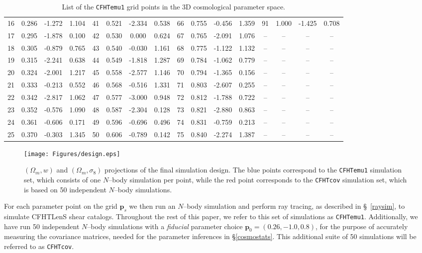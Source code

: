 \documentclass[reprint,aps,prd,superscriptaddress,showkeys,showpacs]{revtex4-1}
\begin{document}
\begin{table*}
\begin{tabular}{c|ccc||c|ccc||c|ccc||c|ccc}
16 & 0.286 & -1.272 & 1.104 & 41 & 0.521 & -2.334 & 0.538 & 66 & 0.755 & -0.456 & 1.359 & 91 & 1.000 & -1.425 & 0.708 \\
17 & 0.295 & -1.878 & 0.100 & 42 & 0.530 & 0.000 & 0.624 & 67 & 0.765 & -2.091 & 1.076 & -- & -- & -- & -- \\
18 & 0.305 & -0.879 & 0.765 & 43 & 0.540 & -0.030 & 1.161 & 68 & 0.775 & -1.122 & 1.132 & -- & -- & -- & -- \\
19 & 0.315 & -2.241 & 0.638 & 44 & 0.549 & -1.818 & 1.287 & 69 & 0.784 & -1.062 & 0.779 & -- & -- & -- & -- \\
20 & 0.324 & -2.001 & 1.217 & 45 & 0.558 & -2.577 & 1.146 & 70 & 0.794 & -1.365 & 0.156 & -- & -- & -- & -- \\
21 & 0.333 & -0.213 & 0.552 & 46 & 0.568 & -0.516 & 1.331 & 71 & 0.803 & -2.607 & 0.255 & -- & -- & -- & -- \\
22 & 0.342 & -2.817 & 1.062 & 47 & 0.577 & -3.000 & 0.948 & 72 & 0.812 & -1.788 & 0.722 & -- & -- & -- & -- \\
23 & 0.352 & -0.576 & 1.090 & 48 & 0.587 & -2.304 & 0.128 & 73 & 0.821 & -2.880 & 0.863 & -- & -- & -- & -- \\
24 & 0.361 & -0.606 & 0.171 & 49 & 0.596 & -0.696 & 0.496 & 74 & 0.831 & -0.759 & 0.213 & -- & -- & -- & -- \\
25 & 0.370 & -0.303 & 1.345 & 50 & 0.606 & -0.789 & 0.142 & 75 & 0.840 & -2.274 & 1.387 & -- & -- & -- & -- \\
\end{tabular}
\caption{List of the \texttt{CFHTemu1} grid points in the 3D cosmological parameter space.}
\label{designtable}
\end{table*}
%
\begin{figure*}
\begin{center}
\texttt{[image: Figures/design.eps]}
\caption{$(\Omega_m,w)$ and $(\Omega_m,\sigma_8)$ projections of the final simulation design. The blue points correspond to the \texttt{CFHTemu1} simulation set, which consists of one $N$--body simulation per point, while the red point corresponds to the \texttt{CFHTcov} simulation set, which is based on 50 independent $N$--body simulations.}
\label{designfig}
\end{center}
\end{figure*}
%

For each parameter point on the grid $\mathbf{p}_s$ we then run an
$N$--body simulation and perform ray tracing, as described in
\S~\ref{raysim}, to simulate CFHTLenS shear catalogs.  Throughout the
rest of this paper, we refer to this set of simulations as
\texttt{CFHTemu1}.  Additionally, we have run 50 independent $N$--body
simulations with a \textit{fiducial} parameter choice
$\mathbf{p}_0=(0.26,-1.0,0.8)$, for the purpose of accurately
measuring the covariance matrices, needed for the parameter inferences
in \S\ref{cosmostats}. This additional suite of 50 simulations will
be referred to as \texttt{CFHTcov}.
\end{document}
